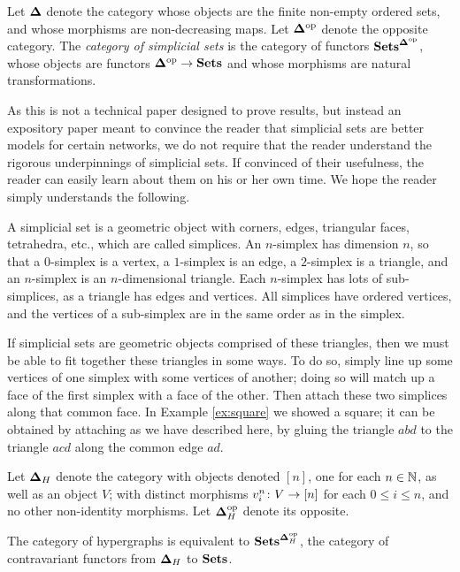 \documentclass{amsart}
\def\bD{{\bf \Delta}}
\begin{document}
\begin{definition}

Let $\bD$ denote the category whose objects are the finite non-empty ordered sets, and whose morphisms are non-decreasing maps.  Let $\bD\op$ denote the opposite category.  The {\em category of simplicial sets} is the category of functors $\Sets^{\bD\op}$, whose objects are functors $\bD\op\to\Sets$ and whose morphisms are natural transformations.

\end{definition}

\begin{remark}\label{rem:all you need to know}

As this is not a technical paper designed to prove results, but instead an expository paper meant to convince the reader that simplicial sets are better models for certain networks, we do not require that the reader understand the rigorous underpinnings of simplicial sets.  If convinced of their usefulness, the reader can easily learn about them on his or her own time.  We hope the reader simply understands the following.

A simplicial set is a geometric object with corners, edges, triangular faces, tetrahedra, etc., which are called simplices.  An $n$-simplex has dimension $n$, so that a $0$-simplex is a vertex, a $1$-simplex is an edge, a $2$-simplex is a triangle, and an $n$-simplex is an $n$-dimensional triangle.  Each $n$-simplex has lots of sub-simplices, as a triangle has edges and vertices.  All simplices have ordered vertices, and the vertices of a sub-simplex are in the same order as in the simplex.

If simplicial sets are geometric objects comprised of these triangles, then we must be able to fit together these triangles in some ways.  To do so, simply line up some vertices of one simplex with some vertices of another; doing so will match up a face of the first simplex with a face of the other.  Then attach these two simplices along that common face.  In Example \ref{ex:square} we showed a square; it can be obtained by attaching as we have described here, by gluing the triangle $abd$ to the triangle $acd$ along the common edge $ad$.

\end{remark}

\begin{lemma}

Let $\bD_H$ denote the category with objects denoted $[n]$, one for each $n\in{\mathbb N}$, as well as an object $V$; with distinct morphisms $v_i^n\colon V\rightarrow[n]$ for each $0\leq i\leq n$, and no other non-identity morphisms.  Let $\bD_H\op$ denote its opposite.  

The category of hypergraphs is equivalent to $\Sets^{\bD_H\op}$, the category of contravariant functors from $\bD_H$ to ${\bf Sets}$.  

\end{lemma}
\end{document}
